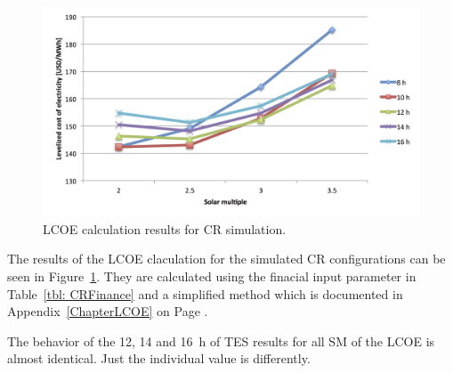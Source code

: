 \begin{figure}[htbp]  
\centering
\includegraphics[width=1\linewidth]{FIG/CR_LCOE}
\caption[LCOE calculation results for CR simulation.]{LCOE calculation results for CR simulation.}\label{CR_LCOE}
\end{figure}

The results of the LCOE claculation for the simulated CR configurations can be seen in Figure~\ref{CR_LCOE}. They are calculated using the finacial input parameter in Table~\ref{tbl: CRFinance} and a simplified method which is documented in Appendix~\ref{ChapterLCOE} on Page \pageref{ChapterLCOE}. 

The behavior of the 12, 14 and \SI{16}{h} of TES results for all SM of the LCOE is almost identical. Just the individual value is differently.

